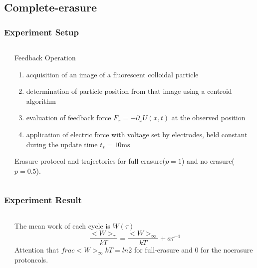 \documentclass[aspectratio=169,10pt]{beamer}
\begin{document}
\subsection{Complete-erasure}
\begin{frame}
    \frametitle{Experiment Setup}
    \begin{columns}
        \begin{column}{0.5\textwidth}
            \centering

        \end{column}
        \begin{column}{0.5\textwidth}
            \centering
            \begin{block}{Feedback Operation\cite{jun2014high}}
                \begin{enumerate}
                    \item acquisition of an image of a fluorescent colloidal particle
                    \item determination of particle position from that image using a centroid algorithm
                    \item evaluation of feedback force $F_x=-\partial_xU(x,t)$ at the observed position
                    \item application of electric force with voltage set by electrodes, held constant during the update time $t_s=10\mathrm{ms}$
                \end{enumerate}
            \end{block}

            Erasure protocol and trajectories for full erasure($p=1$) and no erasure($p=0.5$). 
        \end{column}
    \end{columns}
\end{frame}
\begin{frame}
    \frametitle{Experiment Result}
    \begin{columns}
        \begin{column}{0.5\textwidth}
            \centering
        \end{column}
        \begin{column}{0.5\textwidth}
            The mean work of each cycle is $W(\tau)$
            \[\frac{<W>_\tau}{kT}=\frac{<W>_\infty}{kT}+a\tau^{-1}\] 
            Attention that $frac{<W>_\infty}{kT}=ln2$ for full-erasure and 0 for the noerasure protoncols.
        \end{column}
    \end{columns}
\end{frame}
\end{document}
